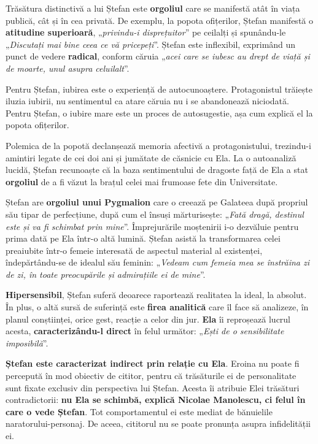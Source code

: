 \documentclass{article}
\newcommand{\qu}[1]{„\emph{#1}”}
\begin{document}
Trăsătura distinctivă a lui Ștefan este \textbf{orgoliul} care se manifestă atât în viața publică, cât și în cea privată. De exemplu, la popota ofițerilor, Ștefan manifestă o \textbf{atitudine superioară}, \qu{privindu-i disprețuitor} pe ceilalți și spunându-le \qu{Discutați mai bine ceea ce vă pricepeți}. Ștefan este inflexibil, exprimând un punct de vedere \textbf{radical}, conform căruia \qu{acei care se iubesc au drept de viață și de moarte, unul asupra celuilalt}.

Pentru Ștefan, iubirea este o experiență de autocunoaștere. Protagonistul trăiește iluzia iubirii, nu sentimentul ca atare căruia nu i se abandonează niciodată. Pentru Ștefan, o iubire mare este un proces de autosugestie, așa cum explică el la popota ofițerilor.

Polemica de la popotă declanșează memoria afectivă a protagonistului, trezindu-i amintiri legate de cei doi ani și jumătate de căsnicie cu Ela. La o autoanaliză lucidă, Ștefan recunoaște că la baza sentimentului de dragoste față de Ela a stat \textbf{orgoliul} de a fi văzut la brațul celei mai frumoase fete din Universitate.

Ștefan are \textbf{orgoliul unui Pygmalion} care o creează pe Galateea după propriul său tipar de perfecțiune, după cum el însuși mărturisește: \qu{Fată dragă, destinul este și va fi schimbat prin mine}. Împrejurările moștenirii i-o dezvăluie pentru prima dată pe Ela într-o altă lumină. Ștefan asistă la transformarea celei preaiubite într-o femeie interesată de aspectul material al existenței, îndepărtându-se de idealul său feminin: \qu{Vedeam cum femeia mea se înstrăina zi de zi, în toate preocupările și admirațiile ei de mine}.

\textbf{Hipersensibil}, Ștefan suferă deoarece raportează realitatea la ideal, la absolut. În plus, o altă sursă de suferință este \textbf{firea analitică} care îl face să analizeze, în planul conștiinței, orice gest, reacție a celor din jur. \textbf{Ela} îi reproșează lucrul acesta, \textbf{caracterizându-l direct} în felul următor: \qu{Ești de o sensibilitate imposibilă}.

\textbf{Ștefan este caracterizat indirect prin relație cu Ela}. Eroina nu poate fi percepută în mod obiectiv de cititor, pentru  că trăsăturile ei de personalitate sunt fixate exclusiv din perspectiva lui Ștefan. Acesta îi atribuie Elei trăsături contradictorii: \textbf{nu Ela se schimbă, explică Nicolae Manolescu, ci felul în care o vede Ștefan}. Tot comportamentul ei este mediat de bănuielile naratorului-personaj. De aceea, cititorul nu se poate pronunța asupra infidelității ei.
\end{document}
